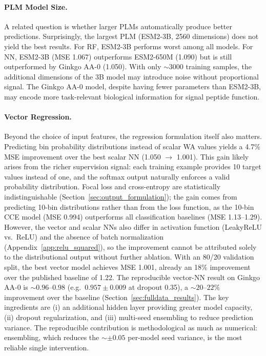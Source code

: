 \documentclass[12pt]{article}
\begin{document}
\paragraph{PLM Model Size.}
A related question is whether larger PLMs automatically produce better predictions.
Surprisingly, the largest PLM (ESM2-3B, 2560 dimensions) does not yield the best results.
For RF, ESM2-3B performs worst among all models.
For NN, ESM2-3B (MSE 1.067) outperforms ESM2-650M (1.090) but is still outperformed by Ginkgo AA-0 (1.050).
With only $\sim$3000 training samples, the additional dimensions of the 3B model may introduce noise without proportional signal.
The Ginkgo AA-0 model, despite having fewer parameters than ESM2-3B, may encode more task-relevant biological information for signal peptide function.

\paragraph{Vector Regression.}
Beyond the choice of input features, the regression formulation itself also matters.
Predicting bin probability distributions instead of scalar WA values yields a 4.7\% MSE improvement over the best scalar NN (1.050 $\to$ 1.001).
This gain likely arises from the richer supervision signal: each training example provides 10 target values instead of one, and the softmax output naturally enforces a valid probability distribution.
Focal loss and cross-entropy are statistically indistinguishable (Section~\ref{sec:output_formulation}); the gain comes from predicting 10-bin distributions rather than from the loss function, as the 10-bin CCE model (MSE 0.994) outperforms all classification baselines (MSE 1.13--1.29).
However, the vector and scalar NNs also differ in activation function (LeakyReLU vs.\ ReLU) and the absence of batch normalization (Appendix~\ref{app:relu_squared}), so the improvement cannot be attributed solely to the distributional output without further ablation.
With an 80/20 validation split, the best vector model achieves MSE 1.001, already an 18\% improvement over the published baseline of 1.22.
The reproducible vector-NN result on Ginkgo AA-0 is ${\sim}0.96$--$0.98$ (e.g.\ $0.957 \pm 0.009$ at dropout 0.35), a ${\sim}20$--$22\%$ improvement over the baseline (Section~\ref{sec:fulldata_results}).
The key ingredients are (i) an additional hidden layer providing greater model capacity, (ii) dropout regularization, and (iii) multi-seed ensembling to reduce prediction variance.
The reproducible contribution is methodological as much as numerical: ensembling, which reduces the ${\sim}{\pm}0.05$ per-model seed variance, is the most reliable single intervention.
\end{document}
